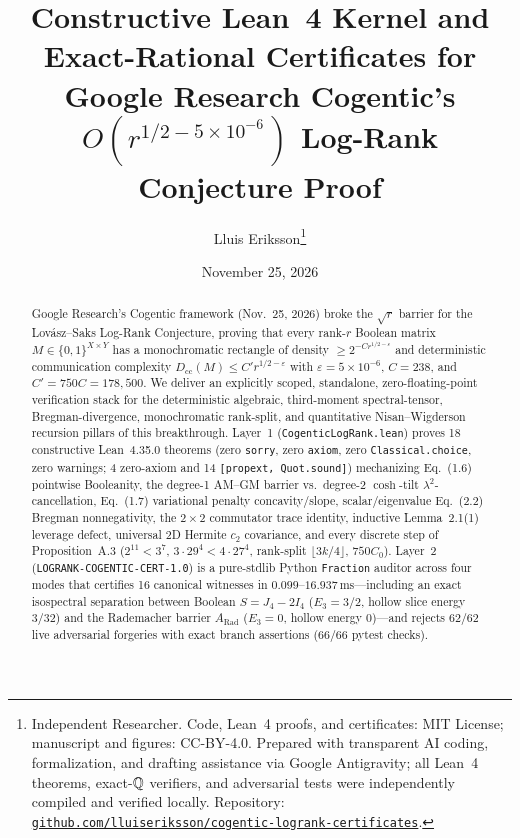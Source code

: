 \documentclass[10pt,twocolumn]{article}
\title{\vspace{-0.9em}\textbf{Constructive Lean~4 Kernel and Exact-Rational Certificates for Google Research Cogentic's $O(r^{1/2 - 5\times 10^{-6}})$ Log-Rank Conjecture Proof}}
\author{Lluis Eriksson\thanks{Independent Researcher. Code, Lean~4 proofs, and certificates: MIT License; manuscript and figures: CC-BY-4.0. Prepared with transparent AI coding, formalization, and drafting assistance via Google Antigravity; all Lean~4 theorems, exact-$\mathbb{Q}$ verifiers, and adversarial tests were independently compiled and verified locally. Repository: \href{https://github.com/lluiseriksson/cogentic-logrank-certificates}{\nolinkurl{github.com/lluiseriksson/cogentic-logrank-certificates}}.}}
\date{November 25, 2026}
\begin{document}
\maketitle
\vspace{-1.2em}

\begin{abstract}
Google Research's Cogentic framework (Nov.~25, 2026) broke the $\sqrt{r}$ barrier for the Lov\'asz--Saks Log-Rank Conjecture, proving that every rank-$r$ Boolean matrix $M\in\{0,1\}^{X\times Y}$ has a monochromatic rectangle of density $\ge 2^{-C r^{1/2-\varepsilon}}$ and deterministic communication complexity $D_{\mathrm{cc}}(M) \le C' r^{1/2-\varepsilon}$ with $\varepsilon = 5\times 10^{-6}$, $C = 238$, and $C' = 750 C = 178{,}500$. We deliver an explicitly scoped, standalone, zero-floating-point verification stack for the deterministic algebraic, third-moment spectral-tensor, Bregman-divergence, monochromatic rank-split, and quantitative Nisan--Wigderson recursion pillars of this breakthrough. Layer~1 (\nolinkurl{CogenticLogRank.lean}) proves 18 constructive Lean~4.35.0 theorems (zero \texttt{sorry}, zero \texttt{axiom}, zero \texttt{Classical.choice}, zero warnings; 4 zero-axiom and 14 \texttt{[propext, Quot.sound]}) mechanizing Eq.~(1.6) pointwise Booleanity, the degree-1 AM--GM barrier vs.\ degree-2 $\cosh$-tilt $\lambda^2$-cancellation, Eq.~(1.7) variational penalty concavity/slope, scalar/eigenvalue Eq.~(2.2) Bregman nonnegativity, the $2\times 2$ commutator trace identity, inductive Lemma~2.1(1) leverage defect, universal 2D Hermite $c_2$ covariance, and every discrete step of Proposition~A.3 ($2^{11}<3^7$, $3\cdot 29^4<4\cdot 27^4$, rank-split $\lfloor 3k/4\rfloor$, $750 C_0$). Layer~2 (\nolinkurl{LOGRANK-COGENTIC-CERT-1.0}) is a pure-stdlib Python \texttt{Fraction} auditor across four modes that certifies 16 canonical witnesses in $0.099$--$16.937\,\mathrm{ms}$—including an exact isospectral separation between Boolean $S=J_4-2I_4$ ($E_3=3/2$, hollow slice energy $3/32$) and the Rademacher barrier $A_{\mathrm{Rad}}$ ($E_3=0$, hollow energy $0$)—and rejects 62/62 live adversarial forgeries with exact branch assertions (66/66 pytest checks).
\end{abstract}
\end{document}
